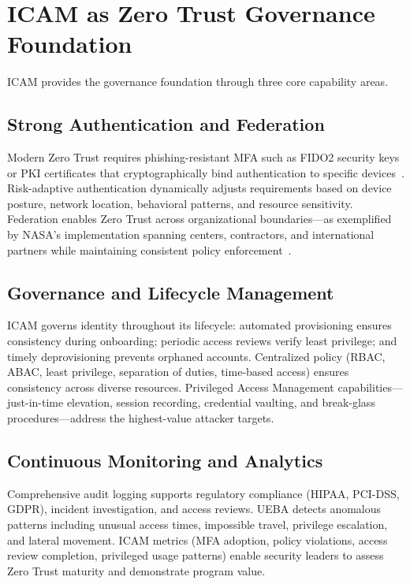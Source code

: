 \documentclass[journal]{IEEEtran}
\begin{document}
\section{ICAM as Zero Trust Governance Foundation}

ICAM provides the governance foundation through three core capability areas.

\subsection{Strong Authentication and Federation}

Modern Zero Trust requires phishing-resistant MFA such as FIDO2 security keys or PKI
certificates that cryptographically bind authentication to specific
devices~\cite{cisa2024mfa}. Risk-adaptive authentication dynamically adjusts requirements
based on device posture, network location, behavioral patterns, and resource sensitivity.
Federation enables Zero Trust across organizational boundaries---as exemplified by NASA's
implementation spanning centers, contractors, and international partners while maintaining
consistent policy enforcement~\cite{pingidentity2024}.

\subsection{Governance and Lifecycle Management}

ICAM governs identity throughout its lifecycle: automated provisioning ensures consistency
during onboarding; periodic access reviews verify least privilege; and timely
deprovisioning prevents orphaned accounts. Centralized policy (RBAC, ABAC, least
privilege, separation of duties, time-based access) ensures consistency across diverse
resources. Privileged Access Management capabilities---just-in-time elevation, session
recording, credential vaulting, and break-glass procedures---address the highest-value
attacker targets.

\subsection{Continuous Monitoring and Analytics}

Comprehensive audit logging supports regulatory compliance (HIPAA, PCI-DSS, GDPR),
incident investigation, and access reviews. UEBA detects anomalous patterns including
unusual access times, impossible travel, privilege escalation, and lateral movement.
ICAM metrics (MFA adoption, policy violations, access review completion, privileged usage
patterns) enable security leaders to assess Zero Trust maturity and demonstrate program
value.
\end{document}
